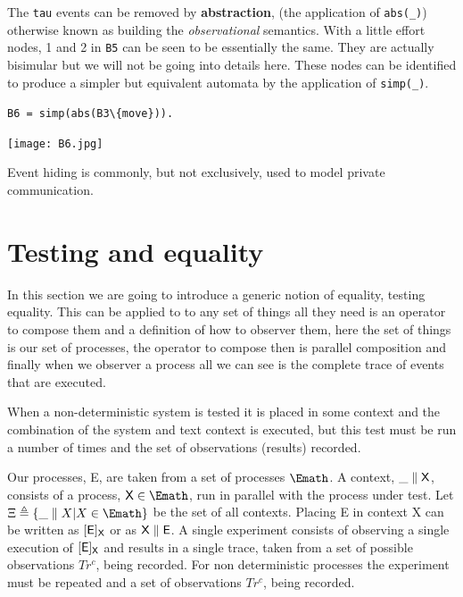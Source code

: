 \documentclass[]{article}
\begin{document}
The \verb$tau$ events  can be removed by {\bf abstraction}, (the application of \verb$abs(_)$) otherwise known as building the \emph{observational} semantics.  With a little effort nodes, 1 and 2 in \verb$B5$ can be seen to be  essentially the same.  They are actually bisimular but we will not be going into details here. These nodes can be identified to produce a simpler but equivalent automata by the application of \verb$simp(_)$.



\noindent\begin{center}\verb$B6 = simp(abs(B3\{move})).$

 \texttt{[image: B6.jpg]} \end{center}


Event hiding is commonly, but not exclusively,   used to model private  communication.

\section{Testing and equality}
In this section we are going to introduce  a  generic notion of equality, testing equality. This can be applied to to any set of things all they need is an operator to compose them and a definition of how to observer them, here the set of things is our set of processes, the operator to compose then is parallel composition and finally when we observer a process all we can see is the complete trace of events that are executed.

When a non-deterministic system is tested it is placed in some context and the combination of the system and text context is executed, but this test must be run a number of times and the set of observations (results) recorded.


Our processes, {\sf E},  are taken from a set of processes $\Emath$. A context, ${\sf \_\parallel X}$, consists of a process, ${\sf X}\in \Emath$,  run in parallel with the process under test. Let  $\Xi\triangleq \{\_\parallel X | X\in \Emath\}$ be  the set of all contexts.
Placing  {\sf E} in context {\sf X} can be   written as  $[{\sf E}]_{\sf X}$ or as ${\sf X\parallel E}$.   A single experiment consists of observing a single execution of $[{\sf E}]_{\sf X}$ and  results in a single trace, taken from a set of possible observations $Tr^c$, being recorded.
For non deterministic processes the experiment must be repeated and a set of observations $Tr^c$, being recorded.
\end{document}
